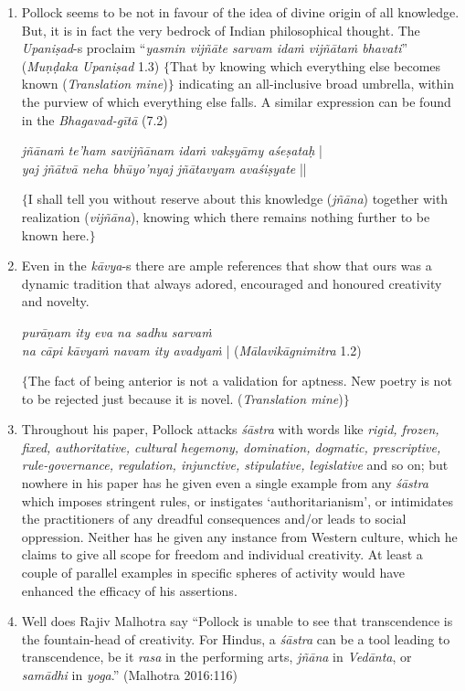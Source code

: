 \begin{enumerate}
\item Pollock seems to be not in favour of the idea of divine origin of all knowledge. But, it is in fact the very bedrock of Indian philosophical thought. The {\sl Upaniṣad}-s proclaim ``{\sl yasmin vijñāte sarvam idaṁ vijñātaṁ bhavati}'' ({\sl Muṇḍaka Upaniṣad} 1.3) $\{$That by knowing which everything else becomes known ({\sl Translation mine})$\}$ indicating an all-inclusive broad umbrella, within the purview of which everything else falls. A similar expression can be found in the {\sl Bhagavad-gītā} (7.2)
\begin{myquote}
{\sl jñānaṁ te'ham savijñānam idaṁ vakṣyāmy aśeṣataḥ} |\\
{\sl yaj jñātvā neha bhūyo'nyaj jñātavyam avaśiṣyate} ||
\end{myquote}
$\{$I shall tell you without reserve about this knowledge ({\sl jñāna}) together with realization ({\sl vijñāna}), knowing which there remains nothing further to be known here.$\}$

\item Even in the {\sl kāvya}-s there are ample references that show that ours was a dynamic tradition that always adored, encouraged and honoured creativity and novelty.
\begin{myquote}
{\sl purāṇam ity eva na sadhu sarvaṁ}\\
{\sl na cāpi kāvyaṁ navam ity avadyaṁ} | ({\sl Mālavikāgnimitra} 1.2)
\end{myquote}
$\{$The fact of being anterior is not a validation for aptness. New poetry is not to be rejected just because it is novel. ({\sl Translation mine})$\}$

\item Throughout his paper, Pollock attacks {\sl śāstra} with words like {\sl rigid, frozen, fixed, authoritative, cultural hegemony, domination, dogmatic, prescriptive, rule-governance, regulation, injunctive, stipulative, legislative} and so on; but nowhere in his paper has he given even a single example from any {\sl śāstra} which imposes stringent rules, or instigates `authoritarianism', or intimidates the practitioners of any dreadful consequences and/or leads to social oppression. Neither has he given any instance from Western culture, which he claims to give all scope for freedom and individual creativity. At least a couple of parallel examples in specific spheres of activity would have enhanced the efficacy of his assertions.

\item Well does Rajiv Malhotra say ``Pollock is unable to see that transcendence is the fountain-head of creativity. For Hindus, a {\sl śāstra} can be a tool leading to transcendence, be it {\sl rasa} in the performing arts, {\sl jñāna} in {\sl Vedānta}, or {\sl samādhi} in {\sl yoga}.'' (Malhotra 2016:116)


\end{enumerate}
